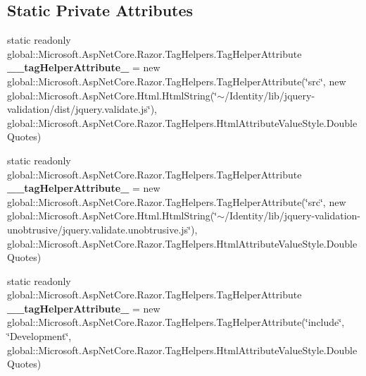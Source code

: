 \subsection*{Static Private Attributes}
\begin{DoxyCompactItemize}
\item 
\mbox{\label{class_projeto_e_s_w_1_1_areas_1_1_identity_1_1_pages_1_1_areas___identity___pages_____validation_scripts_partial_a6bd817ff78945013f33c0eb22f34b916}} 
static readonly global\+::\+Microsoft.\+Asp\+Net\+Core.\+Razor.\+Tag\+Helpers.\+Tag\+Helper\+Attribute {\bfseries \+\_\+\+\_\+tag\+Helper\+Attribute\+\_} = new global\+::\+Microsoft.\+Asp\+Net\+Core.\+Razor.\+Tag\+Helpers.\+Tag\+Helper\+Attribute(\char`\"{}src\char`\"{}, new global\+::\+Microsoft.\+Asp\+Net\+Core.\+Html.\+Html\+String(\char`\"{}$\sim$/Identity/lib/jquery-\/validation/dist/jquery.\+validate.\+js\char`\"{}), global\+::\+Microsoft.\+Asp\+Net\+Core.\+Razor.\+Tag\+Helpers.\+Html\+Attribute\+Value\+Style.\+Double\+Quotes)
\item 
\mbox{\label{class_projeto_e_s_w_1_1_areas_1_1_identity_1_1_pages_1_1_areas___identity___pages_____validation_scripts_partial_a7324fe339f17b99e724dabe4a8265c72}} 
static readonly global\+::\+Microsoft.\+Asp\+Net\+Core.\+Razor.\+Tag\+Helpers.\+Tag\+Helper\+Attribute {\bfseries \+\_\+\+\_\+tag\+Helper\+Attribute\+\_} = new global\+::\+Microsoft.\+Asp\+Net\+Core.\+Razor.\+Tag\+Helpers.\+Tag\+Helper\+Attribute(\char`\"{}src\char`\"{}, new global\+::\+Microsoft.\+Asp\+Net\+Core.\+Html.\+Html\+String(\char`\"{}$\sim$/Identity/lib/jquery-\/validation-\/unobtrusive/jquery.\+validate.\+unobtrusive.\+js\char`\"{}), global\+::\+Microsoft.\+Asp\+Net\+Core.\+Razor.\+Tag\+Helpers.\+Html\+Attribute\+Value\+Style.\+Double\+Quotes)
\item 
\mbox{\label{class_projeto_e_s_w_1_1_areas_1_1_identity_1_1_pages_1_1_areas___identity___pages_____validation_scripts_partial_ae35f77533a59dc64e92c7980523f1210}} 
static readonly global\+::\+Microsoft.\+Asp\+Net\+Core.\+Razor.\+Tag\+Helpers.\+Tag\+Helper\+Attribute {\bfseries \+\_\+\+\_\+tag\+Helper\+Attribute\+\_} = new global\+::\+Microsoft.\+Asp\+Net\+Core.\+Razor.\+Tag\+Helpers.\+Tag\+Helper\+Attribute(\char`\"{}include\char`\"{}, \char`\"{}Development\char`\"{}, global\+::\+Microsoft.\+Asp\+Net\+Core.\+Razor.\+Tag\+Helpers.\+Html\+Attribute\+Value\+Style.\+Double\+Quotes)

\end{DoxyCompactItemize}

